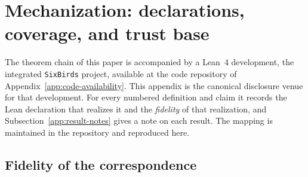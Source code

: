 \documentclass[11pt]{article}
\theoremstyle{definition}
\begin{document}
 \section{Mechanization: declarations, coverage, and trust base}\label{app:mechanization}

The theorem chain of this paper is accompanied by a Lean~4 development, the
integrated \texttt{SixBirds} project, available at the code repository of
Appendix~\ref{app:code-availability}. This appendix is the canonical disclosure
venue for that development. For every numbered definition and claim it records
the Lean declaration that realizes it and the \emph{fidelity} of that
realization, and Subsection~\ref{app:result-notes} gives a note on each result.
The mapping is maintained in the repository and reproduced here.

\subsection{Fidelity of the correspondence}\label{app:fidelity-legend}
\end{document}
